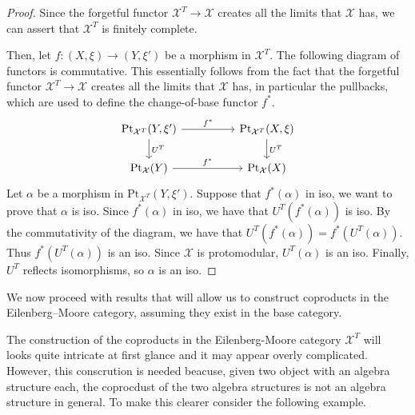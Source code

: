 \begin{subbox}{}
    \begin{proof}
        Since the forgetful functor $\mathcal{X}^T \to \mathcal{X}$ creates all the limits that $\mathcal{X}$ has, we can assert that $\mathcal{X}^T$ is finitely complete.

        Then, let $f:(X,\xi) \to (Y,\xi')$ be a morphism in $\mathcal{X}^T$. The following diagram of functors is commutative. This essentially follows from the fact that the forgetful functor $\mathcal{X}^T \to \mathcal{X}$ creates all the limits that $\mathcal{X}$ has, in particular the pullbacks, which are used to define the change-of-base functor $f^*$.
        \[
\begin{tikzcd}
    {\mathrm{Pt}_{\mathcal{X}^T}(Y,\xi')} \arrow[rr, "f^*"] \arrow[d, "U^T"] &  & {\mathrm{Pt}_{\mathcal{X}^T}(X,\xi)} \arrow[d, "U^T"] \\
    \mathrm{Pt}_{\mathcal{X}}(Y) \arrow[rr, "f^*"]                           &  & \mathrm{Pt}_{\mathcal{X}}(X)                         
    \end{tikzcd}
    \]
    Let $\alpha$ be a morphism in $\mathrm{Pt}_{\mathcal{X}^T}(Y,\xi')$. Suppose that $f^*(\alpha)$ in iso, we want to prove that $\alpha$ is iso. Since $f^*(\alpha)$ in iso, we have that $U^T(f^*(\alpha))$ is iso. By the commutativity of the diagram, we have that $U^T(f^*(\alpha)) = f^*(U^T(\alpha))$. Thus $f^*(U^T(\alpha))$ is an iso. Since $\mathcal{X}$ is protomodular, $U^T(\alpha)$ is an iso. Finally, $U^T$ reflects isomorphisms, so $\alpha$ is an iso.
    \end{proof}
\end{subbox}

We now proceed with results that will allow us to construct coproducts in the Eilenberg–Moore category, assuming they exist in the base category. 

The construction of the coproducts in the Eilenberg-Moore category $\mathcal{X}^T$ will looks quite intricate at first glance and it may appear overly complicated. However, this conscrution is needed beacuse, given two object with an algebra structure each, the coprocdust of the two algebra structures is not an algebra structure in general. To make this clearer consider the following example.

